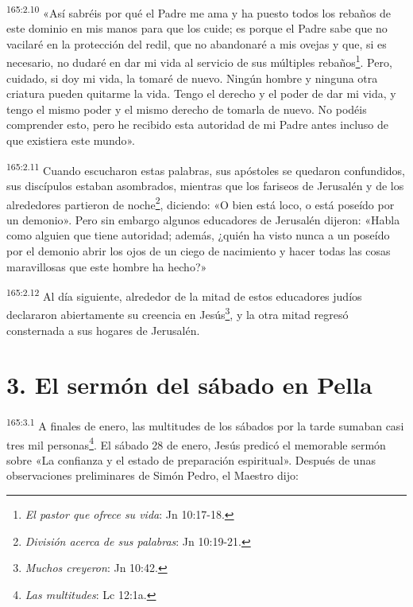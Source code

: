 \par 
\textsuperscript{165:2.10} «Así sabréis por qué el Padre me ama y ha puesto todos los rebaños de este dominio en mis manos para que los cuide; es porque el Padre sabe que no vacilaré en la protección del redil, que no abandonaré a mis ovejas y que, si es necesario, no dudaré en dar mi vida al servicio de sus múltiples rebaños\footnote{\textit{El pastor que ofrece su vida}: Jn 10:17-18.}. Pero, cuidado, si doy mi vida, la tomaré de nuevo. Ningún hombre y ninguna otra criatura pueden quitarme la vida. Tengo el derecho y el poder de dar mi vida, y tengo el mismo poder y el mismo derecho de tomarla de nuevo. No podéis comprender esto, pero he recibido esta autoridad de mi Padre antes incluso de que existiera este mundo».

\par 
\textsuperscript{165:2.11} Cuando escucharon estas palabras, sus apóstoles se quedaron confundidos, sus discípulos estaban asombrados, mientras que los fariseos de Jerusalén y de los alrededores partieron de noche\footnote{\textit{División acerca de sus palabras}: Jn 10:19-21.}, diciendo: «O bien está loco, o está poseído por un demonio». Pero sin embargo algunos educadores de Jerusalén dijeron: «Habla como alguien que tiene autoridad; además, ¿quién ha visto nunca a un poseído por el demonio abrir los ojos de un ciego de nacimiento y hacer todas las cosas maravillosas que este hombre ha hecho?»

\par 
\textsuperscript{165:2.12} Al día siguiente, alrededor de la mitad de estos educadores judíos declararon abiertamente su creencia en Jesús\footnote{\textit{Muchos creyeron}: Jn 10:42.}, y la otra mitad regresó consternada a sus hogares de Jerusalén.

\section*{3. El sermón del sábado en Pella}
\par 
\textsuperscript{165:3.1} A finales de enero, las multitudes de los sábados por la tarde sumaban casi tres mil personas\footnote{\textit{Las multitudes}: Lc 12:1a.}. El sábado 28 de enero, Jesús predicó el memorable sermón sobre «La confianza y el estado de preparación espiritual». Después de unas observaciones preliminares de Simón Pedro, el Maestro dijo:

